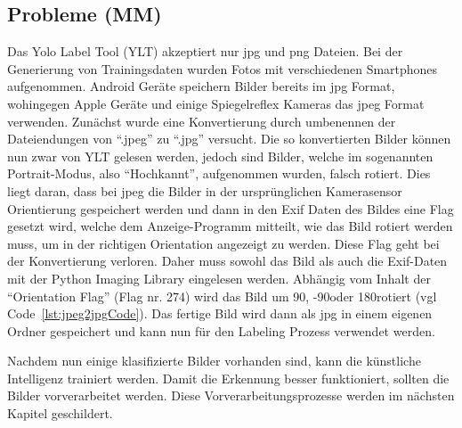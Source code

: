 \documentclass[a4paper,oneside,12pt]{report}
\begin{document}
\begin{onehalfspace}
		\section{Probleme (MM)}
				Das Yolo Label Tool (YLT) akzeptiert nur jpg und png Dateien. Bei der Generierung von Trainingsdaten wurden Fotos mit verschiedenen Smartphones aufgenommen. Android Geräte speichern Bilder bereits im jpg Format, wohingegen Apple Geräte und einige Spiegelreflex Kameras das jpeg Format verwenden. Zunächst wurde eine Konvertierung durch umbenennen der Dateiendungen von "`.jpeg"' zu "`.jpg"' versucht. Die so konvertierten Bilder können nun zwar von YLT gelesen werden, jedoch sind Bilder, welche im sogenannten Portrait-Modus, also "`Hochkannt"', aufgenommen wurden, falsch rotiert. Dies liegt daran, dass bei jpeg die Bilder in der ursprünglichen Kamerasensor Orientierung gespeichert werden und dann in den Exif Daten des Bildes eine Flag gesetzt wird, welche dem Anzeige-Programm mitteilt, wie das Bild rotiert werden muss, um in der richtigen Orientation angezeigt zu werden. Diese Flag geht bei der Konvertierung verloren. Daher muss sowohl das Bild als auch die Exif-Daten mit der Python Imaging Library eingelesen werden. Abhängig vom Inhalt der "`Orientation Flag"' (Flag nr. 274) wird das Bild um 90\degree, -90\degree oder 180\degree rotiert (vgl Code~\ref{lst:jpeg2jpgCode}). Das fertige Bild wird dann als jpg in einem eigenen Ordner gespeichert und kann nun für den Labeling Prozess verwendet werden.
				
				Nachdem nun einige klasifizierte Bilder vorhanden sind, kann die künstliche Intelligenz trainiert werden. Damit die Erkennung besser funktioniert, sollten die Bilder vorverarbeitet werden. Diese Vorverarbeitungsprozesse werden im nächsten Kapitel geschildert.
			
	\end{onehalfspace}
\end{document}
